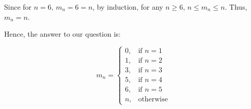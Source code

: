 \documentclass[a4paper, 12pt]{article}
\begin{document}


%     

Since for $n=6$, $m_n=6=n$, by induction, for any $n\geq6$, $n\leq m_n\leq n$. Thus, $m_n=n$.

Hence, the answer to our question is: 

\begin{equation}
m_n= 
\begin{cases}
    0,& \text{if } n=1\\
    1,& \text{if } n=2\\
    3,& \text{if } n=3\\
    5,& \text{if } n=4\\
    6,& \text{if } n=5\\
    n,& \text{otherwise}
\end{cases}
\end{equation}

\clearpage
\end{document}
